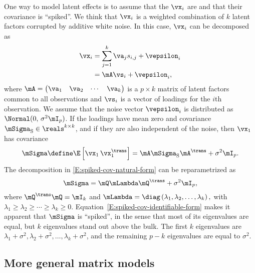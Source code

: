 One way to model latent effects is to assume that the $\vx_i$ are \iid and that their covariance is ``spiked''.  We think that $\vx_i$ is a weighted combination of $k$ latent factors corrupted by additive white noise.  In this case, $\vx_i$ can be decomposed as
\begin{align}
    \vx_i
        &=
        \sum_{j=1}^k
            \va_j
            s_{i,j}
        +
        \vepsilon_i \notag \\
        &=
        \mA \vs_i + \vepsilon_i,
\end{align}
where
\(
    \mA
    =
    \left(
    \begin{matrix}
        \va_1 & \va_2 & \cdots & \va_k
    \end{matrix}
    \right)
\)
is a $p \times k$ matrix of latent factors common to all observations and $\vs_i$ is a vector of loadings for the $i$th observation.  We assume that
the noise vector $\vepsilon_i$ is distributed as $\Normal( 0, \, \sigma^2 \mI_p )$.  If the loadings have mean zero and covariance $\mSigma_\text{S} \in \reals^{k \times k}$, and if they are also independent of the noise, then $\vx_1$ has covariance
\begin{equation}\label{E:spiked-cov-natural-form}
    \mSigma
        \define
        \E \left[ \vx_1 \, \vx_1^\trans \right]
            =
                \mA \mSigma_\text{S} \mA^\trans
                +
                \sigma^2
                \mI_p.
\end{equation}
The decomposition in \eqref{E:spiked-cov-natural-form} can be reparametrized
as
\begin{equation}\label{E:spiked-cov-identifiable-form}
    \mSigma
        =
        \mQ \mLambda \mQ^\trans
        +
        \sigma^2
        \mI_p,
\end{equation}
where $\mQ^\trans \mQ = \mI_k$ and
\(
    \mLambda
        = 
        \diag \left( \lambda_1, \lambda_2, \ldots, \lambda_k \right),
\)
with $\lambda_1 \geq \lambda_2 \geq \cdots \geq \lambda_k \geq 0$.  
Equation~\eqref{E:spiked-cov-identifiable-form} makes it apparent that $\mSigma$ is ``spiked'', in the sense that most of its eigenvalues are equal, but $k$ eigenvalues stand out above the bulk.  The first $k$ eigenvalues
are $\lambda_1 + \sigma^2, \lambda_2 + \sigma^2, \ldots, \lambda_k + \sigma^2$, and the remaining $p-k$ eigenvalues are equal to $\sigma^2$.

\subsection{More general matrix models}

